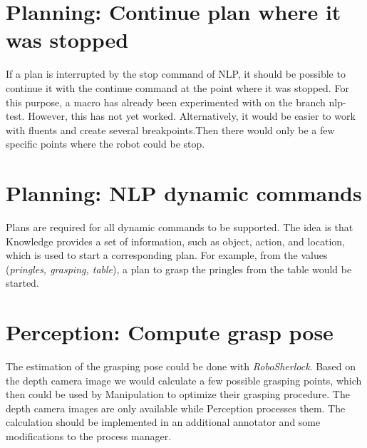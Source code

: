 \documentclass[main.tex]{subfiles}
\begin{document}
		\vspace{0.4cm}
		
		\section{Planning: Continue plan where it was stopped}
		If a plan is interrupted by the stop command of NLP, it should be possible to continue it with the continue command at the point where it was stopped. For this purpose, a macro has already been experimented with on the branch nlp-test. However, this has not yet worked. Alternatively, it would be easier to work with fluents and create several breakpoints.Then there would only be a few specific points where the robot could be stop.
		
		\vspace{0.4cm}
		
		\section{Planning: NLP dynamic commands}
		Plans are required for all dynamic commands to be supported. The idea is that Knowledge provides a set of information, such as object, action, and location, which is used to start a corresponding plan. For example, from the values (\textit{pringles, grasping, table}), a plan to grasp the pringles from the table would be started.
		
		\vspace{0.4cm}
		
		\section{Perception: Compute grasp pose}
		The estimation of the grasping pose could be done with \textit{RoboSherlock}. Based on the depth camera image we would calculate a few possible grasping points, which then could be used by Manipulation to optimize their grasping procedure. The depth camera images are only available while Perception processes them. The calculation should be implemented in an additional annotator and some modifications to the process manager.
		
\end{document}
